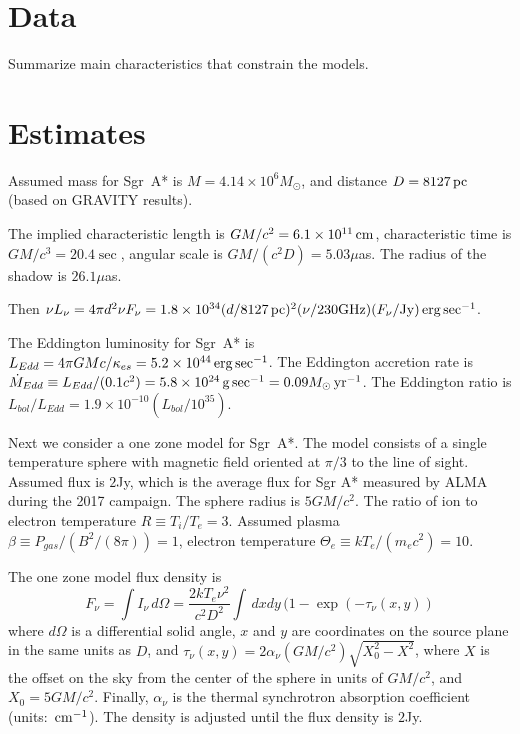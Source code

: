 \documentclass[twocolumn,tighten]{aastex63}
\newcommand\sgra{Sgr~A*\xspace}
\newcommand\msun{{M_\odot}}
\newcommand\yr{{\rm \, yr}}
\newcommand\erg{{\rm \, erg}}
\newcommand\cm{{\rm \, cm}}
\newcommand\pc{{\rm \, pc}}
\newcommand\gm{{\rm \, g}}
\newcommand\<{{\langle}}
\renewcommand\>{{\rangle}} %
\begin{document}
\section{Data}


Summarize main characteristics that constrain the models.

\section{Estimates}

Assumed mass for \sgra is $M = 4.14 \times 10^6 \msun$, and distance $D = 8127\pc$ (based on GRAVITY results).

The implied characteristic length is $G M/c^2 = 6.1 \times 10^{11} \cm$, characteristic time is $G M/c^3 = 20.4\sec$, angular scale is $G M/(c^2 D) = 5.03\mu$as.  The radius of the shadow is $26.1\mu$as.

Then $\nu L_\nu = 4 \pi d^2 \nu F_\nu = 1.8 \times 10^{34} (d/8127 \pc)^2 (\nu/230 {\rm GHz})(F_\nu/{\rm Jy}) \erg \sec^{-1}$.

The Eddington luminosity for \sgra is $L_{Edd} = 4\pi G M c/\kappa_{es} = 5.2 \times 10^{44} \erg\sec^{-1}$. The Eddington accretion rate is $\dot{M}_{Edd} \equiv  L_{Edd}/(0.1 c^2) = 5.8 \times 10^{24} \gm \sec^{-1} = 0.09 \msun \yr^{-1}$.  The Eddington ratio is $L_{bol}/L_{Edd} = 1.9 \times 10^{-10} (L_{bol}/10^{35})$.

Next we consider a one zone model for \sgra.  The model consists of a single temperature sphere with magnetic field oriented at $\pi/3$ to the line of sight.  Assumed flux is $2$Jy, which is the average flux for Sgr A* measured by ALMA during the 2017 campaign.  The sphere radius is $5 G M/c^2$.  The ratio of ion to electron temperature $R \equiv T_i/T_e = 3$.  Assumed plasma $\beta \equiv  P_{gas}/(B^2/(8\pi)) = 1$, electron temperature $\Theta_e \equiv k T_e/(m_e c^2) = 10$.

The one zone model flux density is
\begin{equation}
    F_\nu = \int I_\nu \, d\Omega = \frac{2 k T_e \nu^2}{c^2 D^2} \int \, dx dy\,  (1 - \exp(-\tau_\nu(x,y))
\end{equation}
where $d\Omega$ is a differential solid angle, $x$ and $y$ are coordinates on the source plane in the same units as $D$, and $\tau_\nu(x,y) = 2 \alpha_\nu (G M/c^2) \sqrt{X_0^2 - X^2}$, where $X$ is the offset on the sky from the center of the sphere in units of $GM/c^2$, and $X_0 = 5 G M/c^2$.  Finally, $\alpha_\nu$ is the thermal synchrotron absorption coefficient (units: $\cm^{-1}$).  The density is adjusted until the flux density is $2$Jy.
\end{document}

